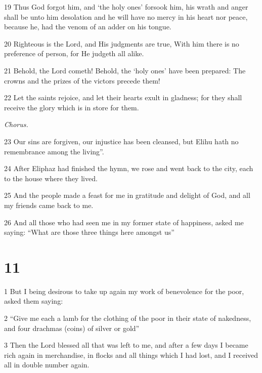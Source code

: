 \par 19 Thus God forgot him, and ‘the holy ones’ forsook him, his wrath and anger shall be unto him desolation and he will have no mercy in his heart nor peace, because he, had the venom of an adder on his tongue.

\par 20 Righteous is the Lord, and His judgments are true, With him there is no preference of person, for He judgeth all alike.

\par 21 Behold, the Lord cometh! Behold, the ‘holy ones’ have been prepared: The crowns and the prizes of the victors precede them!

\par 22 Let the saints rejoice, and let their hearts exult in gladness; for they shall receive the glory which is in store for them.

\par \textit{Chorus.}

\par 23 Our sins are forgiven, our injustice has been cleansed, but Elihu hath no remembrance among the living”.

\par 24 After Eliphaz had finished the hymn, we rose and went back to the city, each to the house where they lived.

\par 25 And the people made a feast for me in gratitude and delight of God, and all my friends came back to me.

\par 26 And all those who had seen me in my former state of happiness, asked me saying: “What are those three things here amongst us”

\chapter{11}

\par 1 But I being desirous to take up again my work of benevolence for the poor, asked them saying:

\par 2 “Give me each a lamb for the clothing of the poor in their state of nakedness, and four drachmas (coins) of silver or gold”

\par 3 Then the Lord blessed all that was left to me, and after a few days I became rich again in merchandise, in flocks and all things which I had lost, and I received all in double number again.

